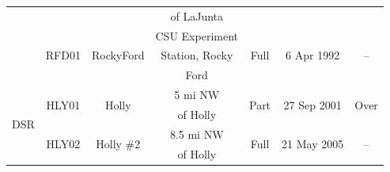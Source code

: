 \begin{linenumbers}
\begin{table}[htb]
\begin{tabular}{ccccccc}
    	                         &                           &                                &   of LaJunta   &                             &                                 &  \\
    	     \cmidrule{2-7}      & \multirow{3}[0]{*}{RFD01} & \multirow{3}[0]{*}{RockyFord}  & CSU Experiment &  \multirow{3}[0]{*}{Full}   & \multirow{3}[0]{*}{6 Apr 1992}  &  \multirow{3}[0]{*}{--}   \\
    	                         &                           &                                & Station, Rocky &                             &                                 &  \\
    	                         &                           &                                &      Ford      &                             &                                 &  \\ \toprule
    	\multirow{6}[0]{*}{DSR}  & \multirow{2}[0]{*}{HLY01} &   \multirow{2}[0]{*}{Holly}    &    5 mi NW     &  \multirow{2}[0]{*}{Part}   & \multirow{2}[0]{*}{27 Sep 2001} & \multirow{2}[0]{*}{Over}  \\
    	                         &                           &                                &    of Holly    &                             &                                 &  \\
    	     \cmidrule{2-7}      & \multirow{2}[0]{*}{HLY02} & \multirow{2}[0]{*}{Holly \#2}  &   8.5 mi NW    &  \multirow{2}[0]{*}{Full}   & \multirow{2}[0]{*}{21 May 2005} &  \multirow{2}[0]{*}{--}   \\
    	                         &                           &                                &    of Holly    &                             &                                 &  \\
    	    \cmidrule{2-7}
    	    \cmidrule{2-7}

\end{tabular}
\end{table}
\end{linenumbers}
